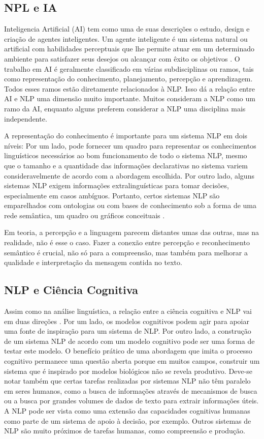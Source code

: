 \documentclass[
	12pt,				%
	openright,			%
	oneside,			%
	a4paper,			%
	english,			%
	spanish,			%
	brazil				%
	]{abntex2}
\begin{document}
	\subsection*{NPL e IA}
	Inteligencia Artificial (AI) tem como uma de suas descrições o estudo, design e criação de agentes inteligentes. Um agente inteligente é um sistema natural ou artificial com habilidades perceptuais que lhe permite atuar em um determinado ambiente para satisfazer seus desejos ou alcançar com êxito os objetivos \cite{norvig}. O trabalho em AI é geralmente classificado em várias subdisciplinas ou ramos, tais como representação do conhecimento, planejamento, percepção e aprendizagem. Todos esses ramos estão diretamente relacionados à NLP. Isso dá a relação entre AI e NLP uma dimensão muito importante. Muitos consideram a NLP como um ramo da AI, enquanto alguns preferem considerar a NLP uma disciplina mais independente. 
	
A representação do conhecimento é importante para um sistema NLP em dois níveis: Por um lado, pode fornecer um quadro para representar os conhecimentos linguísticos necessários ao bom funcionamento de todo o sistema NLP, mesmo que o tamanho e a quantidade das informações declarativas no sistema variem consideravelmente de acordo com a abordagem escolhida. Por outro lado, alguns sistemas NLP exigem informações extralinguísticas para tomar decisões, especialmente em casos ambíguos. Portanto, certos sistemas NLP são emparelhados com ontologias ou com bases de conhecimento sob a forma de uma rede semântica, um quadro ou gráficos conceituais \cite{book_natural_lang}.

Em teoria, a percepção e a linguagem parecem distantes umas das outras, mas na realidade, não é esse o caso. Fazer a conexão entre percepção e reconhecimento semântico é crucial, não só para a compreensão, mas também para melhorar a qualidade e interpretação da mensagem contida no texto. 

	\subsection*{NLP e Ciência Cognitiva}
	Assim como na análise linguística, a relação entre a ciência cognitiva e NLP vai em duas direções \cite{book_natural_lang}. Por um lado, os modelos cognitivos podem agir para apoiar uma fonte de inspiração para um sistema de NLP. Por outro lado, a construção de um sistema NLP de acordo com um modelo cognitivo pode ser uma forma de testar este modelo. O benefício prático de uma abordagem que imita o processo cognitivo permanece uma questão aberta porque em muitos campos, construir um sistema que é inspirado por modelos biológicos não se revela produtivo. Deve-se notar também que certas tarefas realizadas por sistemas NLP não têm paralelo em seres humanos, como a busca de informações através de mecanismos de busca ou a busca por grandes volumes de dados de texto para extrair informações úteis. A NLP pode ser vista como uma extensão das capacidades cognitivas humanas como parte de um sistema de apoio à decisão, por exemplo. Outros sistemas de NLP são muito próximos de tarefas humanas, como compreensão e produção.
	
\end{document}
